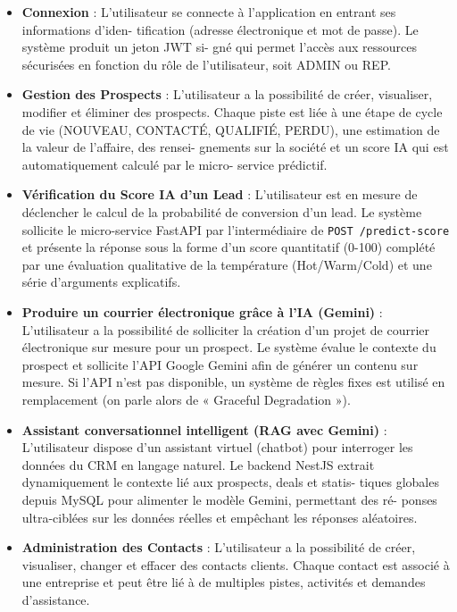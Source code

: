 \begin{itemize}
    \item \textbf{Connexion} : L’utilisateur se connecte à l’application en entrant ses informations d’iden-
    tification (adresse électronique et mot de passe). Le système produit un jeton JWT si-
    gné qui permet l’accès aux ressources sécurisées en fonction du rôle de l’utilisateur, soit ADMIN ou REP.
    
    \item \textbf{Gestion des Prospects} : L’utilisateur a la possibilité de créer, visualiser, modifier et éliminer des prospects. Chaque piste est liée à une étape de cycle de vie (NOUVEAU, CONTACTÉ, QUALIFIÉ, PERDU), une estimation de la valeur de l’affaire, des rensei-
    gnements sur la société et un score IA qui est automatiquement calculé par le micro-
    service prédictif.
    
    \item \textbf{Vérification du Score IA d’un Lead} : L’utilisateur est en mesure de déclencher le calcul de la probabilité de conversion d’un lead. Le système sollicite le micro-service FastAPI par l’intermédiaire de \texttt{POST /predict-score} et présente la réponse sous la forme d’un score quantitatif (0-100) complété par une évaluation qualitative de la température (Hot/Warm/Cold) et une série d’arguments explicatifs.
    
    \item \textbf{Produire un courrier électronique grâce à l’IA (Gemini)} : L’utilisateur a la possibilité de solliciter la création d’un projet de courrier électronique sur mesure pour un prospect. Le système évalue le contexte du prospect et sollicite l’API Google Gemini afin de générer un contenu sur mesure. Si l’API n’est pas disponible, un système de règles fixes est utilisé en remplacement (on parle alors de « Graceful Degradation »).
    
    \item \textbf{Assistant conversationnel intelligent (RAG avec Gemini)} : L’utilisateur dispose d’un assistant virtuel (chatbot) pour interroger les données du CRM en langage naturel. Le backend NestJS extrait dynamiquement le contexte lié aux prospects, deals et statis-
    tiques globales depuis MySQL pour alimenter le modèle Gemini, permettant des ré-
    ponses ultra-ciblées sur les données réelles et empêchant les réponses aléatoires.
    
    \item \textbf{Administration des Contacts} : L’utilisateur a la possibilité de créer, visualiser, changer et effacer des contacts clients. Chaque contact est associé à une entreprise et peut être lié à de multiples pistes, activités et demandes d’assistance.
    

\end{itemize}
